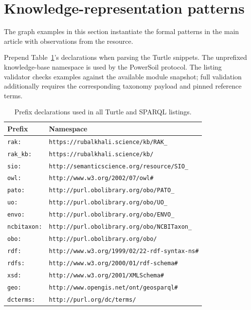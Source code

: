 \section{Knowledge-representation patterns}\label{supp:kr}

The graph examples in this section instantiate the formal patterns
in the main article with observations from the resource.

Prepend Table~\ref{tab:supp_prefixes}'s declarations when parsing the
Turtle snippets. The unprefixed knowledge-base namespace is used by
the PowerSoil protocol. The listing validator checks examples against
the available module snapshot; full validation additionally requires
the corresponding taxonomy payload and pinned reference terms.

\begin{table}[h]
\centering
\caption{Prefix declarations used in all Turtle and SPARQL listings.}
\label{tab:supp_prefixes}
\small
\begin{tabular}{ll}
\toprule
\textbf{Prefix} & \textbf{Namespace} \\
\midrule
\texttt{rak:}      & \texttt{https://rubalkhali.science/kb/RAK\_} \\
\texttt{rak\_kb:}  & \texttt{https://rubalkhali.science/kb/} \\
\texttt{sio:}      & \texttt{http://semanticscience.org/resource/SIO\_} \\
\texttt{owl:}      & \texttt{http://www.w3.org/2002/07/owl\#} \\
\texttt{pato:}     & \texttt{http://purl.obolibrary.org/obo/PATO\_} \\
\texttt{uo:}       & \texttt{http://purl.obolibrary.org/obo/UO\_} \\
\texttt{envo:}     & \texttt{http://purl.obolibrary.org/obo/ENVO\_} \\
\texttt{ncbitaxon:}& \texttt{http://purl.obolibrary.org/obo/NCBITaxon\_} \\
\texttt{obo:}      & \texttt{http://purl.obolibrary.org/obo/} \\
\texttt{rdf:}      & \texttt{http://www.w3.org/1999/02/22-rdf-syntax-ns\#} \\
\texttt{rdfs:}     & \texttt{http://www.w3.org/2000/01/rdf-schema\#} \\
\texttt{xsd:}      & \texttt{http://www.w3.org/2001/XMLSchema\#} \\
\texttt{geo:}      & \texttt{http://www.opengis.net/ont/geosparql\#} \\
\texttt{dcterms:}  & \texttt{http://purl.org/dc/terms/} \\
\bottomrule
\end{tabular}
\end{table}

